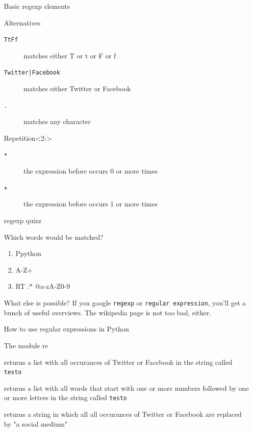 \documentclass{beamer}
\begin{document}
\begin{frame}{Basic regexp elements}
\begin{block}{Alternatives}
\begin{description}
\item[{\tt{\lbrack TtFf\rbrack}}] matches either T or t or F or f
\item[{\tt{Twitter|Facebook}}] matches either Twitter or Facebook
\item[{\tt{.}}] matches any character
\end{description}
\end{block}
\begin{block}{Repetition}<2->
\begin{description}
\item[{\tt{*}}] the expression before occurs 0 or more times
\item[{\tt{+}}] the expression before occurs 1 or more times
\end{description}
\end{block}
\end{frame}

\begin{frame}{regexp quizz}
\begin{block}{Which words would be matched?}
\tt
\begin{enumerate}
\item<1-> \lbrack Pp\rbrack ython
\item<2-> \lbrack A-Z\rbrack +
\item<3-> RT :* @\lbrack a-zA-Z0-9\rbrack *
\end{enumerate}
\end{block}
\end{frame}

\begin{frame}{What else is possible?}
If you google {\tt{regexp}} or {\tt{regular expression}}, you'll get a bunch of useful overviews. The wikipedia page is not too bad, either. 
\end{frame}

\begin{frame}{How to use regular expressions in Python}
\begin{block}{The module re}
\begin{description}
\item<1->[{\tt{re.findall("\lbrack Tt\rbrack witter|\lbrack Ff\rbrack acebook",testo)}}] returns a list with all occurances of Twitter or Facebook in the string called {\tt{testo}}
\item<1->[{\tt{re.findall("\lbrack 0-9\rbrack +\lbrack a-zA-Z\rbrack +",testo)}}] returns a list with all words that start with one or more numbers followed by one or more letters in the string called {\tt{testo}}
\item<2->[{\tt{re.sub("\lbrack Tt\rbrack witter|\lbrack Ff\rbrack acebook","a social medium",testo)}}] returns a string in which all all occurances of Twitter or Facebook are replaced by "a social medium"
\end{description}
\end{block}
\end{frame}
\end{document}
